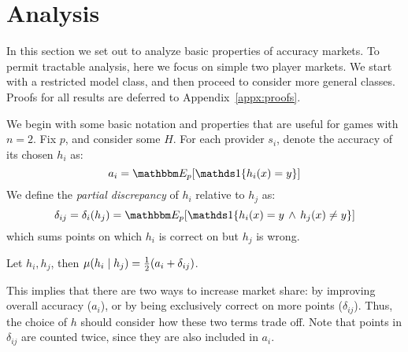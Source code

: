 \section{Analysis}

In this section we set out to
analyze basic properties of accuracy markets. 
To permit tractable analysis,
here we focus on simple two player markets.
We start with a restricted model class,
and then proceed to consider more general classes.
Proofs for all results are deferred to Appendix~\ref{appx:proofs}.

We begin with some basic notation and properties that are useful for games
with $n=2$. Fix $p$, and consider some $H$.
For each provider $s_i$,
denote the accuracy of its chosen $h_i$ as:
\squeeze
\begin{equation}
\label{eq:acc}
a_i = \expect{p}{\one{h_i(x)=y}}
\end{equation}
We define the \emph{partial discrepancy} of $h_i$ relative to $h_j$ as:
\begin{equation}
\label{eq:discrepancy}    
\delta_{ij} = \delta_{i}(h_j) = \expect{p}{\one{h_i(x)=y \,\wedge\, h_j(x) \neq y}}
\end{equation}
which sums points on which $h_i$ is correct on but $h_j$ is wrong.

\begin{proposition}
\label{prop:utils_of_players}
Let $h_i,h_j$,
then
$\mu(h_i \mid h_j) = \frac{1}{2}(a_i + \delta_{ij})$.
\end{proposition}
This implies that there are two ways to increase market share: by improving overall accuracy ($a_i$),
or by being exclusively correct on more points ($\delta_{ij}$).
Thus, the choice of $h$ should consider how these two terms trade off.
Note that points in $\delta_{ij}$ are counted twice,
since they are also included in $a_i$.
\squeeze


